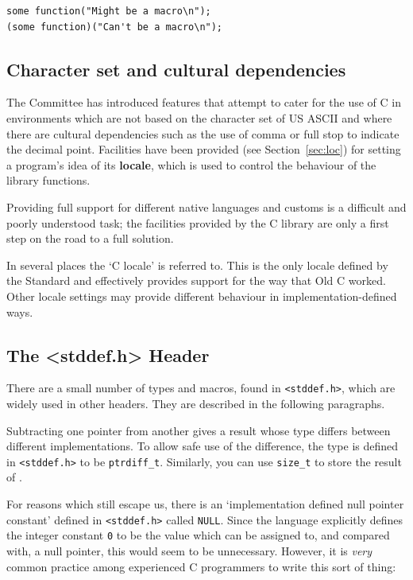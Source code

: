    \begin{Verbatim}
some function("Might be a macro\n");
(some function)("Can't be a macro\n");
\end{Verbatim}

  

  \subsection{Character set and cultural dependencies}
   

   The Committee has introduced features that attempt to cater
    for the use of C in environments which are not based on the
    character set of US ASCII and where there are cultural
    dependencies such as the use of comma or full stop to
    indicate the decimal point.  Facilities have been provided
    (see Section~\ref{sec:loc}) for setting a program's idea of its
    \textbf{locale}, which is used to control the behaviour of the
    library functions.


   Providing full support for different native languages and
    customs is a difficult and poorly understood task; the
    facilities provided by the C library are only a first step
    on the road to a full solution.


   In several places the `C locale' is referred to.  This is
    the only locale defined by the Standard and effectively
    provides support for the way that Old C worked.  Other
    locale settings may provide different behaviour in
    implementation-defined ways.


  

  \subsection{The <stddef.h> Header}
   

   There are a small number of types and macros, found in
    \texttt{<stddef.h>}, which are widely used in other headers.
    They are described in the following paragraphs.


   Subtracting one pointer from another gives a result whose
    type differs between different implementations.  To allow
    safe use of the difference, the type is defined in
    \texttt{<stddef.h>} to be \texttt{ptrdiff\_t}.  Similarly, you
    can use \texttt{size\_t} to store the result of \sizeof.


   For reasons which still escape us, there is an `implementation
    defined null pointer constant' defined in \texttt{<stddef.h>}
    called \texttt{NULL}.  Since the language explicitly
    defines the integer constant \texttt{0} to be the value which can be
    assigned to, and compared with, a null pointer, this would
    seem to be unnecessary.  However, it is \textit{very} common practice
    among experienced C programmers to write this sort of thing:


